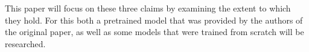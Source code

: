 \begin{itemize}

\end{itemize}
 This paper will focus on these three claims by examining the extent to which they hold. For this both a pretrained model that was provided by the authors of the original paper, as well as some models that were trained from scratch will be researched.


